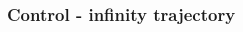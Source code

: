 \begin{frame}
\frametitle{Control - infinity trajectory}
\begin{columns}
	\begin{column}{0.5\textwidth}
	\begin{figure}
	\end{figure}
	\end{column}
	\begin{column}{0.5\textwidth}
	\begin{figure}
	\end{figure}
	\end{column}
\end{columns}
\end{frame}
